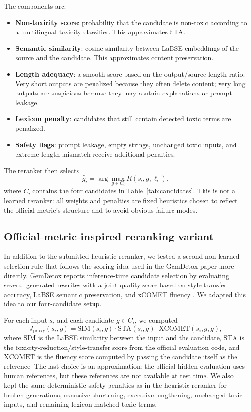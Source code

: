 \documentclass{article}
\begin{document}
The components are:
\begin{itemize}
    \item \textbf{Non-toxicity score}: probability that the candidate is non-toxic according to a multilingual toxicity classifier. This approximates STA.
    \item \textbf{Semantic similarity}: cosine similarity between LaBSE embeddings of the source and the candidate. This approximates content preservation.
    \item \textbf{Length adequacy}: a smooth score based on the output/source length ratio. Very short outputs are penalized because they often delete content; very long outputs are suspicious because they may contain explanations or prompt leakage.
    \item \textbf{Lexicon penalty}: candidates that still contain detected toxic terms are penalized.
    \item \textbf{Safety flags}: prompt leakage, empty strings, unchanged toxic inputs, and extreme length mismatch receive additional penalties.
\end{itemize}

The reranker then selects
\begin{equation}
\hat{g}_i = \arg\max_{g \in C_i} R(s_i,g,\ell_i),
\end{equation}
where $C_i$ contains the four candidates in Table~\ref{tab:candidates}. This is not a learned reranker: all weights and penalties are fixed heuristics chosen to reflect the official metric's structure and to avoid obvious failure modes.


\subsection{Official-metric-inspired reranking variant}

In addition to the submitted heuristic reranker, we tested a second non-learned selection rule that follows the scoring idea used in the GemDetox paper more directly. GemDetox reports inference-time candidate selection by evaluating several generated rewrites with a joint quality score based on style transfer accuracy, LaBSE semantic preservation, and xCOMET fluency \cite{dang2025gemdetox}. We adapted this idea to our four-candidate setup.

For each input $s_i$ and each candidate $g \in C_i$, we computed
\begin{equation}
J_{\mathrm{proxy}}(s_i,g)=\mathrm{SIM}(s_i,g)\cdot \mathrm{STA}(s_i,g)\cdot \mathrm{XCOMET}(s_i,g,g),
\label{eq:metricrerank}
\end{equation}
where $\mathrm{SIM}$ is the LaBSE similarity between the input and the candidate, $\mathrm{STA}$ is the toxicity-reduction/style-transfer score from the official evaluation code, and $\mathrm{XCOMET}$ is the fluency score computed by passing the candidate itself as the reference. The last choice is an approximation: the official hidden evaluation uses human references, but these references are not available at test time. We also kept the same deterministic safety penalties as in the heuristic reranker for broken generations, excessive shortening, excessive lengthening, unchanged toxic inputs, and remaining lexicon-matched toxic terms.
\end{document}
